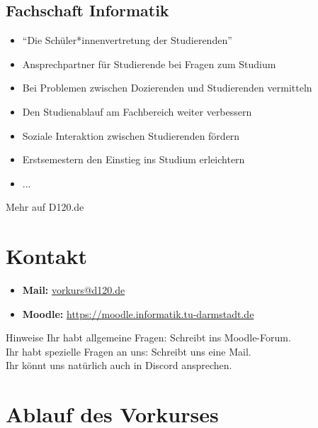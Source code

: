 \subsection*{Fachschaft Informatik}
\begin{frame}
	\slidehead
	\begin{itemize}
		\item "`Die Schüler*innenvertretung der Studierenden"'
		\item Ansprechpartner für Studierende bei Fragen zum Studium
		\item Bei Problemen zwischen Dozierenden und Studierenden vermitteln
		\item Den Studienablauf am Fachbereich weiter verbessern
		\item Soziale Interaktion zwischen Studierenden fördern
		\item Erstsemestern den Einstieg ins Studium erleichtern
		\item ...
	\end{itemize}
\centering
\vspace{3mm}
\huge Mehr auf D120.de
\end{frame}

\section{Kontakt}
\begin{frame}
	\slidehead
	\begin{itemize}
		\item \textbf{Mail:} \href{mailto:vorkurs@d120.de}{vorkurs@d120.de}
		\item \textbf{Moodle:}  \href{https://moodle.informatik.tu-darmstadt.de/course/view.php?id=624} {https://moodle.informatik.tu-darmstadt.de}
	\end{itemize}
	\vspace{2.5cm}
	\begin{alertblock}{Hinweise}
		Ihr habt allgemeine Fragen: Schreibt ins Moodle-Forum. \\
		Ihr habt spezielle Fragen an uns: Schreibt uns eine Mail. \\
		Ihr könnt uns natürlich auch in Discord ansprechen.
	\end{alertblock}
\end{frame}

\section{Ablauf des Vorkurses}
